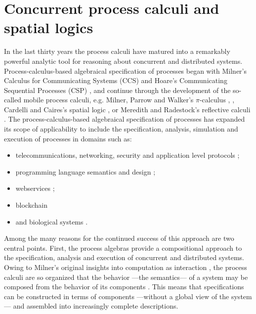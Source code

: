 \section{Concurrent process calculi and spatial logics }\label{sec:concurrent_process_calculi_and_spatial_logics_} %
In the last thirty years the process calculi have matured into a
remarkably powerful analytic tool for reasoning about concurrent and
distributed systems. Process-calculus-based algebraical specification of
processes began with Milner's Calculus for Communicating Systems (CCS)
\cite{DBLP:books/sp/Milner80} and Hoare's Communicating Sequential Processes
(CSP) \cite{DBLP:books/ph/Hoare85}, and continue
through the development of the so-called mobile process calculi,
e.g. Milner, Parrow and Walker's $\pi$-calculus \cite{DBLP:journals/iandc/MilnerPW92a}, \cite{DBLP:journals/iandc/MilnerPW92b},
Cardelli and Caires's spatial logic \cite{DBLP:conf/fossacs/Caires04} \cite{DBLP:journals/iandc/CairesC03} \cite{DBLP:journals/tcs/CairesC04}
\cite{Caires04}, or Meredith and Radestock's reflective calculi
\cite{DBLP:journals/entcs/MeredithR05} \cite{DBLP:conf/tgc/MeredithR05}. The process-calculus-based
algebraical specification of processes has expanded its scope of
applicability to include the specification, analysis, simulation and
execution of processes in domains such as:

\begin{itemize}
\item telecommunications, networking, security and application level protocols
\cite{DBLP:conf/popl/AbadiB02} 
\cite{DBLP:journals/tcs/AbadiB03} 
\cite{DBLP:conf/epew/BrownLM05} 
\cite{DBLP:conf/fossacs/LaneveZ05}; 
\item programming language semantics and design
\cite{BrownLM05}
\cite{djoin}
\cite{JoCaml}
\cite{WojciechowskiS99};
\item webservices
\cite{BrownLM05}
\cite{LaneveZ05}
\cite{MeredithB03};
\item{blockchain}
  \cite{RChain2022}
\item and biological systems
\cite{Cardelli04}
\cite{DanosL03}
\cite{RegevS03}
\cite{PriamiRSS01}.
\end{itemize}

Among the many reasons for the continued success of this approach are
two central points. First, the process algebras provide a
compositional approach to the specification, analysis and execution of
concurrent and distributed systems. Owing to Milner's original
insights into computation as interaction \cite{Milner93}, the process
calculi are so organized that the behavior ---the semantics--- of a
system may be composed from the behavior of its components
\cite{Fokkink}. This means that specifications can be constructed in
terms of components ---without a global view of the system--- and
assembled into increasingly complete descriptions.

